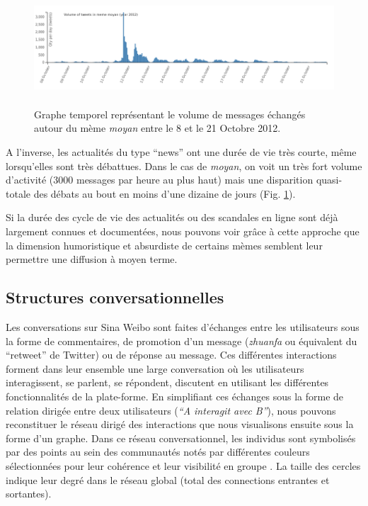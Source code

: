 \begin{figure}[h!]
    \centering
    \includegraphics[width=6.0087in,height=1.6697in]{figures/chap4/chapitre4-img6.png}
    \caption{
      Graphe temporel représentant le volume de messages échangés autour du mème \textit{moyan} entre le 8 et le 21 Octobre 2012.
    }
    \label{fig:time-moyan}
\end{figure}

A l{\textquoteright}inverse, les actualités du type {\textquotedblleft}news{\textquotedblright} ont une durée de vie très courte, même lorsqu{\textquoteright}elles sont très débattues. Dans le cas de \textit{moyan}, on voit un très fort volume d{\textquoteright}activité (3000 messages par heure au plus haut) mais une disparition quasi-totale des débats au bout en moins d{\textquoteright}une dizaine de jours (Fig. \ref{fig:time-moyan}).

Si la durée des cycle de vie des actualités ou des scandales en ligne sont déjà largement connues et documentées, nous pouvons voir grâce à cette approche que la dimension humoristique et absurdiste de certains mèmes semblent leur permettre une diffusion à moyen terme.


\subsection[Structures conversationnelles]{Structures conversationnelles}

Les conversations sur Sina Weibo sont faites d{\textquoteright}échanges entre les utilisateurs sous la forme de commentaires, de promotion d{\textquoteright}un message (\textit{zhuanfa} ou  équivalent du {\textquotedblleft}retweet{\textquotedblright} de Twitter) ou de réponse au message. Ces différentes interactions forment dans leur ensemble une large conversation o\`u les utilisateurs interagissent, se parlent, se répondent, discutent en utilisant les différentes fonctionnalités de la plate-forme. En simplifiant ces échanges sous la forme de relation dirigée entre deux utilisateurs (\textit{{\textquotedblleft}A interagit avec B{\textquotedblright}}), nous pouvons reconstituer le réseau dirigé des interactions que nous visualisons ensuite sous la forme d{\textquoteright}un graphe. Dans ce réseau conversationnel, les individus sont symbolisés par des points au sein des communautés notés par différentes couleurs sélectionnées pour leur cohérence et leur visibilité en groupe \citep{Lin2013}. La taille des cercles indique leur degré dans le réseau global (total des connections entrantes et sortantes).


